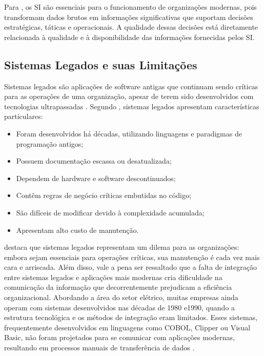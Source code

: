 Para \cite{turban2010}, os SI são essenciais para o funcionamento de organizações modernas, pois transformam dados brutos em informações significativas que suportam decisões estratégicas, táticas e operacionais. A qualidade dessas decisões está diretamente relacionada à qualidade e à disponibilidade das informações fornecidas pelos SI.

\subsection{Sistemas Legados e suas Limitações}

Sistemas legados são aplicações de software antigas que continuam sendo críticas para as operações de uma organização, apesar de terem sido desenvolvidos com tecnologias ultrapassadas \cite{bennett1995}. Segundo \cite{brooke1998}, sistemas legados apresentam características particulares:

\begin{itemize}
    \item Foram desenvolvidos há décadas, utilizando linguagens e paradigmas de programação antigos;
    \item Possuem documentação escassa ou desatualizada;
    \item Dependem de hardware e software descontinuados;
    \item Contêm regras de negócio críticas embutidas no código;
    \item São difíceis de modificar devido à complexidade acumulada;
    \item Apresentam alto custo de manutenção.
\end{itemize}

\cite{pressman2016} destaca que sistemas legados representam um dilema para as organizações: embora sejam essenciais para operações críticas, sua manutenção é cada vez mais cara e arriscada. Além disso, vale a pena ser ressaltado que a falta de integração entre sistemas legados e aplicações mais modernas cria dificuldade na comunicação da informação que decorrentemente prejudicam a eficiência organizacional.
Abordando a área do setor elétrico, muitas empresas ainda operam com sistemas desenvolvidos nas décadas de 1980 e1990, quando a estrutura tecnológica e os métodos de integração eram limitados. Esses sistemas, frequentemente desenvolvidos em linguagens como COBOL, Clipper ou Visual Basic, não foram projetados para se comunicar com aplicações modernas, resultando em processos manuais de transferência de dados \cite{rezende2017}.

